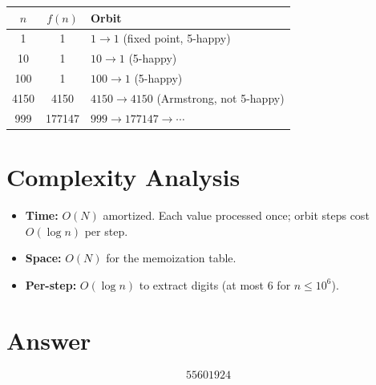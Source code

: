 \documentclass[11pt]{article}
\theoremstyle{definition}
\begin{document}
\begin{center}
\begin{tabular}{ccl}
\toprule
$n$ & $f(n)$ & Orbit \\
\midrule
1 & 1 & $1 \to 1$ (fixed point, 5-happy) \\
10 & 1 & $10 \to 1$ (5-happy) \\
100 & 1 & $100 \to 1$ (5-happy) \\
4150 & 4150 & $4150 \to 4150$ (Armstrong, not 5-happy) \\
999 & 177147 & $999 \to 177147 \to \cdots$ \\
\bottomrule
\end{tabular}
\end{center}

\section{Complexity Analysis}

\begin{itemize}
    \item \textbf{Time:} $O(N)$ amortized. Each value processed once; orbit steps cost $O(\log n)$ per step.
    \item \textbf{Space:} $O(N)$ for the memoization table.
    \item \textbf{Per-step:} $O(\log n)$ to extract digits (at most 6 for $n \leq 10^6$).
\end{itemize}

\section{Answer}

\[
\boxed{55601924}
\]
\end{document}

